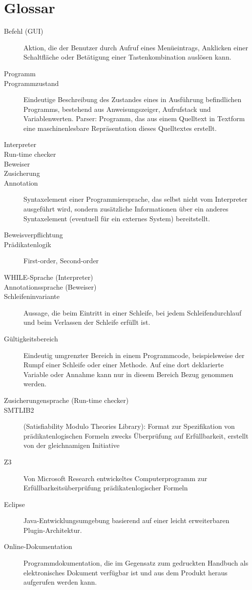 \section{Glossar}
\begin{description}
    \item[Befehl (GUI)] Aktion, die der Benutzer durch Aufruf eines Menüeintrags, Anklicken einer Schaltfläche oder Betätigung einer Tastenkombination auslösen kann.
    \item[Programm]
    \item[Programmzustand] Eindeutige Beschreibung des Zustandes eines in Ausführung befindlichen Programms, bestehend aus Anweisungszeiger, Aufrufstack und Variablenwerten.
    Parser: Programm, das aus einem Quelltext in Textform eine maschinenlesbare Repräsentation dieses Quelltextes erstellt.
    \item[Interpreter]
    \item[Run-time checker]
    \item[Beweiser]
    \item[Zusicherung]
    \item[Annotation] Syntaxelement einer Programmiersprache, das selbst nicht vom Interpreter ausgeführt wird, sondern zusätzliche Informationen über ein anderes Syntaxelement (eventuell für ein externes System) bereitstellt.
    \item[Beweisverpflichtung]
    \item[Prädikatenlogik] First-order, Second-order
    \item[WHILE-Sprache (Interpreter)]
    \item[Annotationssprache (Beweiser)]
    \item[Schleifeninvariante] Aussage, die beim Eintritt in einer Schleife, bei jedem Schleifendurchlauf und beim Verlassen der Schleife erfüllt ist.
    \item[Gültigkeitsbereich] Eindeutig umgrenzter Bereich in einem Programmcode, beispielsweise der Rumpf einer Schleife oder einer Methode. Auf eine dort deklarierte Variable oder Annahme kann nur in diesem Bereich Bezug genommen werden.
    \item[Zusicherungensprache (Run-time checker)]
    \item[SMTLIB2] (Satisfiability Modulo Theories Library): Format zur Spezifikation von prädikatenlogischen Formeln zwecks Überprüfung auf Erfüllbarkeit, erstellt von der gleichnamigen Initiative
    \item[Z3] Von Microsoft Research entwickeltes Computerprogramm zur Erfüllbarkeitsüberprüfung prädikatenlogischer Formeln
    \item[Eclipse] Java-Entwicklungsumgebung basierend auf einer leicht erweiterbaren Plugin-Architektur.
    \item[Online-Dokumentation] Programmdokumentation, die im Gegensatz zum gedruckten Handbuch als elektronisches Dokument verfügbar ist und aus dem Produkt heraus aufgerufen werden kann.
\end{description}

